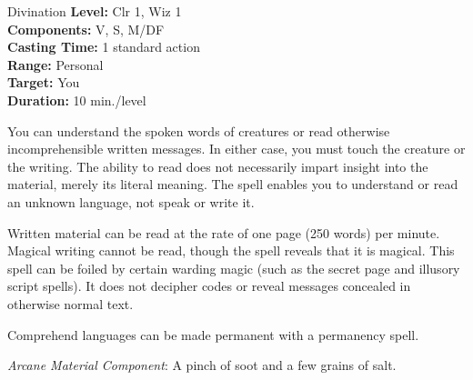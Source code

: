 {Divination}
{
	\textbf{Level:}
	Clr 1, Wiz 1\\
	\textbf{Components:}
	V, S, M/DF\\
	\textbf{Casting Time:}
	1 standard action\\
	\textbf{Range:}
	Personal\\
	\textbf{Target:}
	You\\
	\textbf{Duration:}
	10 min./level\\
}
{
	You can understand the spoken words of creatures or read otherwise incomprehensible written messages. In either case, you must touch the creature or the writing. The ability to read does not necessarily impart insight into the material, merely its literal meaning. The spell enables you to understand or read an unknown language, not speak or write it.

	Written material can be read at the rate of one page (250 words) per minute. Magical writing cannot be read, though the spell reveals that it is magical. This spell can be foiled by certain warding magic (such as the secret page and illusory script spells). It does not decipher codes or reveal messages concealed in otherwise normal text.

	Comprehend languages can be made permanent with a permanency spell.

	\textit{Arcane Material Component}:
	A pinch of soot and a few grains of salt.

}
